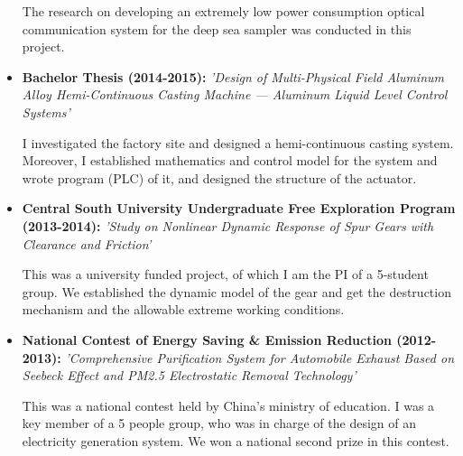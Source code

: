 \documentclass[11pt,a4paper,sans]{moderncv}         %
\begin{document}
\begin{itemize}
{    \vspace{3pt}

    \small{The research on developing an extremely low power consumption optical communication system for the deep sea sampler was conducted in this project.}}

    \vspace{6pt}

    \item{\textbf{Bachelor Thesis (2014-2015): }\textit{'Design of Multi-Physical Field Aluminum Alloy Hemi-Continuous Casting Machine — Aluminum Liquid Level Control Systems'}

    \vspace{3pt}

    \small{I investigated the factory site and designed a hemi-continuous casting system. Moreover, I established mathematics and control model for the system and wrote program (PLC) of it, and designed the structure of the actuator.}}

    \vspace{6pt}

    \item{\textbf{Central South University Undergraduate Free Exploration Program (2013-2014): }\textit{'Study on Nonlinear Dynamic Response of Spur Gears with Clearance and Friction'}

    \vspace{3pt}

    \small{This was a university funded project, of which I am the PI of a 5-student group. We established the dynamic model of the gear and get the destruction mechanism and the allowable extreme working conditions.}}

    \vspace{6pt}

    \item{\textbf{National Contest of Energy Saving \& Emission Reduction (2012-2013): }\textit{'Comprehensive Purification System for Automobile Exhaust Based on Seebeck Effect and PM2.5 Electrostatic Removal Technology'}

    \vspace{3pt}

    \small{This was a national contest held by China's ministry of education. I was a key member of a 5 people group, who was in charge of the design of an electricity generation system. We won a national second prize in this contest.}}

    \end{itemize}
\end{document}
